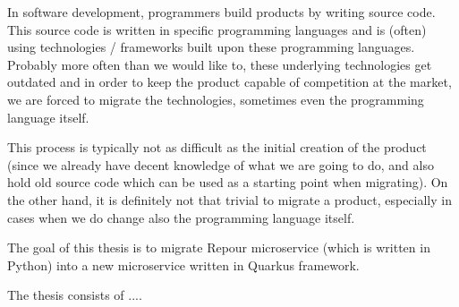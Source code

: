 \documentclass[../../main.tex]{subfiles}
\begin{document}
In software development, programmers build products by writing source code. This source code is written in specific programming languages and is (often) using technologies / frameworks built upon these programming languages. Probably more often than we would like to, these underlying technologies get outdated and in order to keep the product capable of competition at the market, we are forced to migrate the technologies, sometimes even the programming language itself.

This process is typically not as difficult as the initial creation of the product (since we already have decent knowledge of what we are going to do, and also hold old source code which can be used as a starting point when migrating). On the other hand, it is definitely not that trivial to migrate a product, especially in cases when we do change also the programming language itself.

The goal of this thesis is to migrate Repour microservice (which is written in Python) into a new microservice written in Quarkus framework.

The thesis consists of .... %
\end{document}

